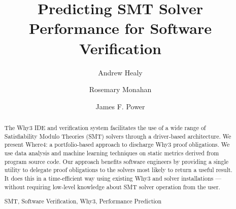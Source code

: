 \documentclass[runningheads,a4paper]{llncs}
\newcommand{\keywords}[1]{\par\addvspace\baselineskip
\noindent\keywordname\enspace\ignorespaces#1}
\begin{document}
\mainmatter  %

\title{Predicting SMT Solver Performance for Software Verification}


%
%
\author{Andrew Healy%
\and Rosemary Monahan \and James F. Power}
%


%
%

\maketitle


\begin{abstract}
The \textsf{Why3} IDE and verification system facilitates the use of a wide range of Satisfiability Modulo Theories (SMT) solvers through a driver-based architecture. We present \textsf{Where4}: a portfolio-based approach to discharge \textsf{Why3} proof obligations. We use data analysis and machine learning techniques on static metrics derived from program source code. Our approach benefits software engineers by providing a single utility to delegate proof obligations to the solvers most likely to return a useful result. It does this in a time-efficient way using existing \textsf{Why3} and solver installations --- without requiring low-level knowledge about SMT solver operation from the user.
\keywords{SMT, Software Verification, \textsf{Why3}, Performance Prediction}
\end{abstract}
\end{document}

